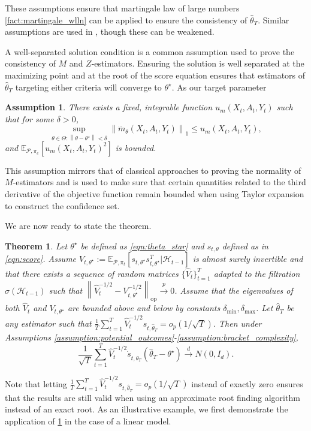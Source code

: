 \documentclass[11pt]{article}
\newcommand{\E}{\mathbb{E}}
\newcommand{\norm}[1]{\left\lVert#1\right\rVert}
\newtheorem{theorem}{Theorem}
\newtheorem{assumption}{Assumption}
\begin{document}
These assumptions ensure that martingale law of large numbers \cref{fact:martingale_wlln} can be applied to ensure the consistency of $\hat{\theta}_{T}$. Similar assumptions are used in \cite{kato2020standardized}, though these can be weakened.

A well-separated solution condition is a common assumption used to prove the consistency of $M$ and $Z$-estimators. Ensuring the solution is well separated at the maximizing point and at the root of the score equation ensures that estimators of $\hat{\theta}_{T}$ targeting either criteria will converge to $\theta^{\star}$. As our target parameter  
 \fi


\begin{assumption} \label{assumption:domination}
There exists a fixed, integrable function  $u_{m}(X_{t},A_{t},Y_{t})$ such that for some $\delta >0$, $$\sup_{\theta \in \Theta:\norm{\theta - \theta^{\star}} < \delta} \norm{\dddot{m}_{\theta}(X_{t},A_{t},Y_{t})}_{1} \le u_{m}(X_{t},A_{t},Y_{t}),$$
and $\E_{\mathcal{P},\pi_e}\left[ u_{m}(X_{t},A_{t},Y_{t})^{2} \right]$ is bounded. 
\end{assumption} 



This assumption mirrors that of classical approaches to proving the normality of $M$-estimators \citep{van2000asymptotic} and is used to make sure that certain quantities related to the third derivative of the objective function remain bounded when using Taylor expansion to construct the confidence set. 

We are now ready to state the theorem. 

\begin{theorem} \label{thm:clt} 
Let $\theta^{\star}$ be defined as \cref{eqn:theta_star} and $s_{t,\theta}$ defined as in \cref{eqn:score}. Assume $V_{t,\theta^{\star}} := \mathbb{E}_{\mathcal{P},\pi_{t}}\left[ s_{t,\theta^{\star}}s_{t,\theta^{\star}}^{T} | \mathcal{H}_{t-1}\right]$ is almost surely invertible and that there exists a sequence of random matrices $\{\hat{V}_{t}\}_{t=1}^{T}$ adapted to the filtration $\sigma(\mathcal{H}_{t-1})$ such that $\norm{\hat{V}_{t}^{-1/2} - V_{t,\theta^{\star}}^{-1/2}}_{\text{op}} \overset{p}{\to} 0$. Assume that the eigenvalues of both $\hat{V}_{t}$ and $V_{t,\theta^{\star}}$ are bounded above and below by constants $\delta_{\text{min}}, \delta_{\text{max}}$.  Let $\hat{\theta}_{T}$ be any estimator such that  $\frac{1}{T}\sum_{t=1}^{T}\hat{V}_{t}^{-1/2} s_{t,\hat{\theta}_{T}} = o_{p}(1/\sqrt{T})$. 
Then under Assumptions \ref{assumption:potential_outcomes}-\ref{assumption:bracket_complexity},
$$\frac{1}{\sqrt{T}} \sum_{t=1}^{T}\hat{V}_{t}^{-1/2} \dot{s}_{t,\hat{\theta}_{T}} \left(\hat{\theta}_{T}- \theta^{\star} \right) \overset{d}{\to} N(0,I_{d}).$$
\end{theorem}
Note that letting $\frac{1}{T}\sum_{t=1}^{T}\hat{V}_{t}^{-1/2} s_{t,\hat{\theta}_{T}} = o_{p}(1/\sqrt{T})$ instead of exactly zero ensures that the results are still valid when using an approximate root finding algorithm instead of an exact root. As an illustrative example, we first demonstrate the application of \cref{thm:clt} in the case of a linear model. 
\end{document}

